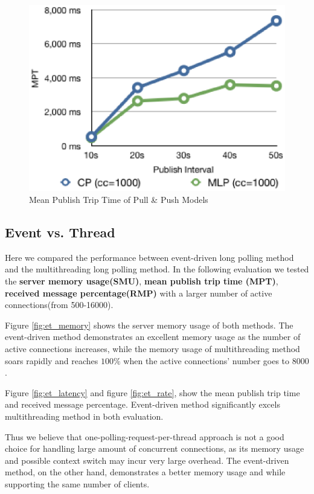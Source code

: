 \begin{figure}[htb!]
\centering%
    \includegraphics[scale=0.70]{figures/latency.eps}
    \caption{Mean Publish Trip Time of Pull \& Push Models}
    \label{fig:traffic_latency}
\end{figure}

\subsection{Event vs. Thread\\}

Here we compared the performance between event-driven long polling method
and the multithreading long polling method. In the following evaluation
we tested the {\bf server memory usage(SMU)}, {\bf mean publish trip time
(MPT)}, {\bf received message percentage(RMP)} with a larger number of
active connections(from 500-16000).

Figure \ref{fig:et_memory} shows the server memory usage of both methods.
The event-driven method demonstrates an excellent memory usage as the
number of active connections increases, while the memory usage of 
multithreading method soars rapidly and reaches $100\%$ when the active
connections' number goes to $8000$.

Figure \ref{fig:et_latency} and figure \ref{fig:et_rate}, show the mean
publish trip time and received message percentage. Event-driven method 
significantly excels multithreading method in both evaluation.

Thus we believe that one-polling-request-per-thread approach is not a good 
choice for handling large amount of concurrent connections, as its
memory usage and possible context switch may incur very large overhead.
The event-driven method, on the other hand, demonstrates a better 
memory usage and while supporting the same number of clients.  

